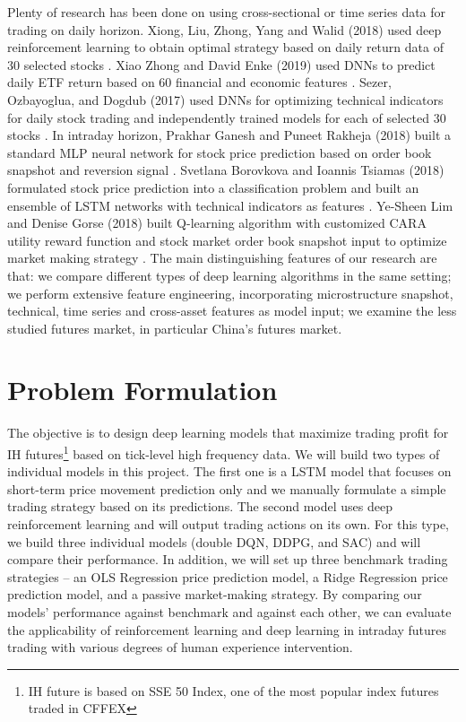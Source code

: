 \documentclass{article}
\begin{document}
Plenty of research has been done on using cross-sectional or time series data for trading on daily horizon. Xiong, Liu, Zhong, Yang and Walid (2018) used deep reinforcement learning to obtain optimal strategy based on daily return data of 30 selected stocks \cite{xiong2018practical}. Xiao Zhong and David Enke (2019) used DNNs to predict daily ETF return based on 60 financial and economic features \cite{Zhong2019}. Sezer, Ozbayoglua, and Dogdub (2017) used DNNs for optimizing technical indicators for daily stock trading and independently trained models for each of selected 30 stocks \cite{SEZER2017473}. In intraday horizon, Prakhar Ganesh and Puneet Rakheja (2018) built a standard MLP neural network for stock price prediction based on order book snapshot and reversion signal \cite{ganesh2018deep}. Svetlana Borovkova and Ioannis Tsiamas (2018) formulated stock price prediction into a classification problem and built an ensemble of LSTM networks with technical indicators as features \cite{doi:10.1002/for.2585}. Ye-Sheen Lim and Denise Gorse (2018) built Q-learning algorithm with customized CARA utility reward function and stock market order book snapshot input to optimize market making strategy \cite{DBLP:conf/esann/LimG18}. The main distinguishing features of our research are that: we compare different types of deep learning algorithms in the same setting; we perform extensive feature engineering, incorporating microstructure snapshot, technical, time series and cross-asset features as model input; we examine the less studied futures market, in particular China’s futures market.

\section{Problem Formulation}

The objective is to design deep learning models that maximize trading profit for IH futures\footnote{IH future is based on SSE 50 Index, one of the most popular index futures traded in CFFEX} based on tick-level high frequency data. We will build two types of individual models in this project. The first one is a LSTM model that focuses on short-term price movement prediction only and we manually formulate a simple trading strategy based on its predictions. The second model uses deep reinforcement learning and will output trading actions on its own. For this type, we build three individual models (double DQN, DDPG, and SAC) and will compare their performance. In addition, we will set up three benchmark trading strategies – an OLS Regression price prediction model, a Ridge Regression price prediction model, and a passive market-making strategy. By comparing our models’ performance against benchmark and against each other, we can evaluate the applicability of reinforcement learning and deep learning in intraday futures trading with various degrees of human experience intervention.
\end{document}
